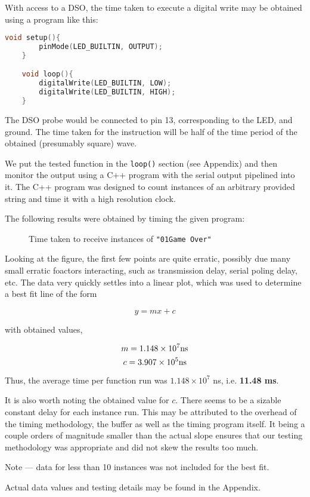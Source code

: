 \newpage


\begin{arabicparts}
    
    \questionpart
    With access to a DSO, the time taken to execute a digital write
    may be obtained using a program like this:
    
    \begin{lstlisting}[language=C++]
    void setup(){
        pinMode(LED_BUILTIN, OUTPUT);
    }

    void loop(){
        digitalWrite(LED_BUILTIN, LOW);
        digitalWrite(LED_BUILTIN, HIGH);
    }
    \end{lstlisting}

    The DSO probe would be connected to pin 13, corresponding to
    the LED, and ground. The time taken for the instruction will
    be half of the time period of the obtained (presumably square) wave.

    \questionpart
    We put the tested function in the \texttt{loop()} section (see Appendix)
    and then monitor the output using a C++ program with the serial output 
    pipelined into it. The C++ program was designed to count instances 
    of an arbitrary provided string and time it with a high resolution clock.
    
    The following results were obtained by timing the given program:

    \begin{figure}[ht]
        \centering
        
        \caption{Time taken to receive instances of \texttt{"01Game Over"}}
        \label{fig:timegraph}
    \end{figure}

    Looking at the figure, the first few points are quite erratic, possibly
    due many small erratic foactors interacting, such as transmission delay, serial
    poling delay, etc. The data very quickly settles into a linear plot, which
    was used to determine a best fit line of the form

    $$y = mx + c$$
    
    with obtained values,

    $$m = 1.148 \times 10^{7} \textnormal{ns}$$
    $$c = 3.907 \times 10^{5} \textnormal{ns}$$

    Thus, the average time per function run was $1.148 \times 10^{7}$ ns, i.e. \textbf{11.48 ms}.

    It is also worth noting the obtained value for $c$. There seems to be a sizable
    constant delay for each instance run. This may be attributed to the overhead
    of the timing methodology, the buffer as well as the timing program itself.
    It being a couple orders of magnitude smaller than the actual slope ensures
    that our testing methodology was appropriate and did not skew the results 
    too much. 

    {\small Note --- data for less than 10 instances was not included for the best fit.}

    {\small Actual data values and testing details may be found in the Appendix.}

\end{arabicparts}